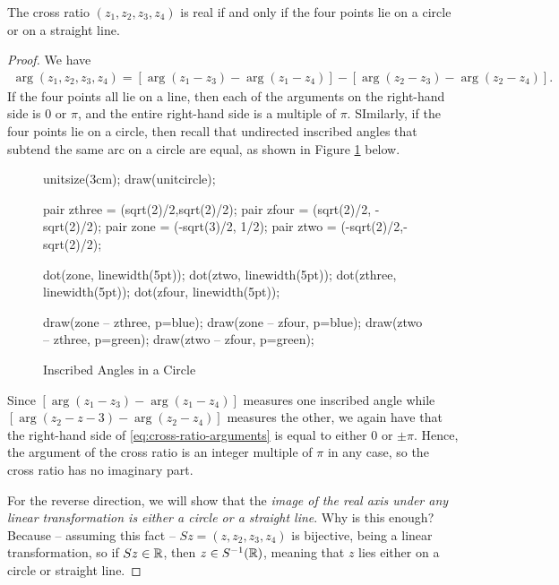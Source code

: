 \begin{theorem}
	\label{thm:cross-ratio-real}
	The cross ratio $(z_1,z_2,z_3,z_4)$ is real if and only if the four points lie on a circle or on a straight line.
\end{theorem}
\begin{proof}
	We have
	\begin{align}
		\label{eq:cross-ratio-arguments}
	\arg (z_1,z_2,z_3,z_4)=\left[\arg (z_1-z_3)-\arg(z_1-z_4)\right]-\left[\arg (z_2-z_3)-\arg (z_2-z_4)\right].
	\end{align}
	If the four points all lie on a line, then each of the arguments on the right-hand side is $0$ or $\pi$, and the entire right-hand side is a multiple of $\pi$. SImilarly, if the four points lie on a circle, then recall that undirected inscribed angles that subtend the same arc on a circle are equal, as shown in Figure \ref{fig:inscribed-angles} below.
	
	\begin{figure}[h]
		\label{fig:inscribed-angles}
		\caption{Inscribed Angles in a Circle}
		\centering
		\begin{asy}
		unitsize(3cm);
		draw(unitcircle);
		
		pair zthree = (sqrt(2)/2,sqrt(2)/2);
		pair zfour = (sqrt(2)/2, -sqrt(2)/2);
		pair zone = (-sqrt(3)/2, 1/2);
		pair ztwo = (-sqrt(2)/2,-sqrt(2)/2);
		
		dot(zone, linewidth(5pt));
		dot(ztwo, linewidth(5pt));
		dot(zthree, linewidth(5pt));
		dot(zfour, linewidth(5pt));
		
		draw(zone -- zthree, p=blue);
		draw(zone -- zfour, p=blue);
		draw(ztwo -- zthree, p=green);
		draw(ztwo -- zfour, p=green);
		
		\end{asy}
	\end{figure}
	Since $\left[\arg (z_1-z_3)-\arg(z_1-z_4)\right]$ measures one inscribed angle while  \\ $\left[\arg (z_2-z-3)-\arg (z_2-z_4)\right]$ measures the other, we again have that the right-hand side of \ref{eq:cross-ratio-arguments} is equal to either $0$ or $\pm \pi$. Hence, the argument of the cross ratio is an integer multiple of $\pi$ in any case, so the cross ratio has no imaginary part.
	
	For the reverse direction, we will show that the \textit{image of the real axis under any linear transformation is either a circle or a straight line}. Why is this enough? Because -- assuming this fact -- $Sz=(z,z_2,z_3,z_4)$ is bijective, being a linear transformation, so if $Sz \in \mathbb R$, then $z \in S^{-1}(\mathbb R)$, meaning that $z$ lies either on a circle or straight line.
	

\end{proof}
